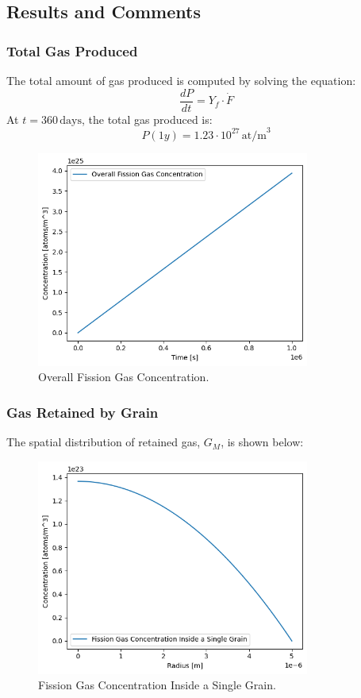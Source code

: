 \subsection{Results and Comments}

\subsubsection{Total Gas Produced}

The total amount of gas produced is computed by solving the equation:
\begin{equation}
    \frac{dP}{dt} = Y_f \cdot \dot{F}
\end{equation}
At $t = 360 \, \text{days}$, the total gas produced is:
\[
P(1y) = 1.23 \cdot 10^{27} \, \text{at/m}^3
\]

\begin{figure}[H]
    \centering
    \includegraphics[width=0.8\textwidth]{FGR_1.png}
    \caption{Overall Fission Gas Concentration.}
    \label{fig:FGR_1}
\end{figure}

\subsubsection{Gas Retained by Grain}

The spatial distribution of retained gas, $G_M$, is shown below:
\begin{figure}[H]
    \centering
    \includegraphics[width=0.8\textwidth]{FGR_2.png}
    \caption{Fission Gas Concentration Inside a Single Grain.}
    \label{fig:FGR_2}
\end{figure}

